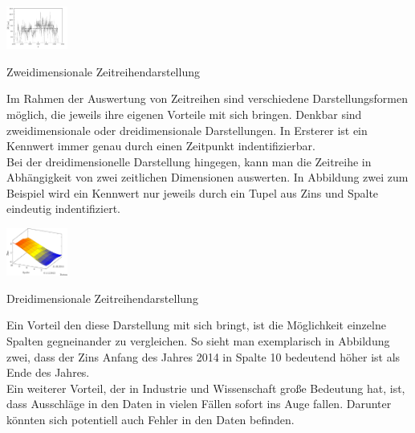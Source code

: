 \documentclass[12pt]{article}
\begin{document}
			\begin{floatingfigure}[r]{4cm}
					\includegraphics[width=2cm]{img/zeitreihe_2D_linie.jpg}
					\caption[2D]{Zweidimensionale
					Zeitreihendarstellung\footnotemark[1]}
			\end{floatingfigure}
		
	
		Im Rahmen der Auswertung von Zeitreihen sind verschiedene Darstellungsformen
		möglich, die jeweils ihre eigenen Vorteile mit sich bringen. Denkbar sind
		zweidimensionale oder dreidimensionale Darstellungen. In Ersterer ist ein
		Kennwert immer genau durch einen Zeitpunkt indentifizierbar.\\[0.4cm]
			
			
		Bei der dreidimensionelle Darstellung hingegen, kann man die Zeitreihe in
		Abhängigkeit von zwei zeitlichen Dimensionen auswerten.
		In Abbildung zwei zum Beispiel wird ein Kennwert nur jeweils durch ein Tupel
		aus Zins und Spalte eindeutig indentifiziert.\\[0.4cm]
		
			\begin{floatingfigure}[H]{4cm}
					\includegraphics[width=2cm]{img/zeitreihe_3D.png}
					\caption[3D]{Dreidimensionale
					Zeitreihendarstellung\footnotemark}
			\end{floatingfigure}
		
		Ein Vorteil den diese Darstellung mit sich bringt, ist die Möglichkeit
		einzelne Spalten gegneinander zu vergleichen. So sieht man exemplarisch in
		Abbildung zwei, dass der Zins Anfang des Jahres 2014 in Spalte 10 bedeutend
		höher ist als Ende des Jahres.\\
		

		
		Ein weiterer Vorteil, der in Industrie und Wissenschaft große Bedeutung
		hat, ist, dass Ausschläge in den Daten in vielen Fällen sofort ins
		Auge fallen. Darunter könnten sich potentiell auch Fehler in den Daten
		befinden.\\[0.4cm]
		
\end{document}
